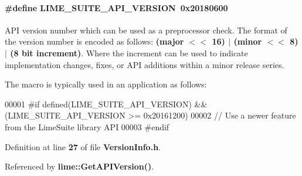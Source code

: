 \paragraph[{L\+I\+M\+E\+\_\+\+S\+U\+I\+T\+E\+\_\+\+A\+P\+I\+\_\+\+V\+E\+R\+S\+I\+ON}]{\setlength{\rightskip}{0pt plus 5cm}\#define L\+I\+M\+E\+\_\+\+S\+U\+I\+T\+E\+\_\+\+A\+P\+I\+\_\+\+V\+E\+R\+S\+I\+ON~0x20180600}\label{VersionInfo_8h_a4e0b6712ce4d9151cdc0f19facc2b5cd}
A\+PI version number which can be used as a preprocessor check. The format of the version number is encoded as follows\+: {\bfseries (major $<$$<$ 16) $\vert$ (minor $<$$<$ 8) $\vert$ (8 bit increment)}. Where the increment can be used to indicate implementation changes, fixes, or A\+PI additions within a minor release series.

The macro is typically used in an application as follows\+: 
\begin{DoxyCode}
00001 #if defined(LIME\_SUITE\_API\_VERSION) && (LIME\_SUITE\_API\_VERSION >= 0x20161200)
00002 // Use a newer feature from the LimeSuite library API
00003 #endif
\end{DoxyCode}
 

Definition at line {\bf 27} of file {\bf Version\+Info.\+h}.



Referenced by {\bf lime\+::\+Get\+A\+P\+I\+Version()}.

